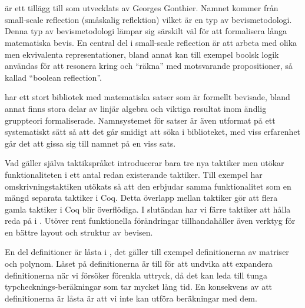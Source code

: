 \section{\ssr{}}
\label{sec:ssr}
\ssr{} är ett tillägg till \coq{} som utvecklats av Georges Gonthier. Namnet
kommer från small-scale reflection (småskalig reflektion) vilket är en typ av
bevismetodologi. Denna typ av bevismetodologi lämpar sig särskilt väl för att
formalisera långa matematiska bevis. En central del i small-scale reflection är
att arbeta med olika men ekvivalenta representationer, bland annat kan till
exempel boolsk logik användas för att resonera kring och ``räkna'' med
motsvarande propositioner, så kallad ``boolean reflection''.

\ssr{} har ett stort bibliotek med matematiska satser som är formellt bevisade,
bland annat finns stora delar av linjär algebra och viktiga resultat inom
ändlig gruppteori formaliserade. Namnsystemet för satser är även utformat på
ett systematiskt sätt så att det går smidigt att söka i biblioteket, med viss
erfarenhet går det att gissa sig till namnet på en viss sats.

Vad gäller själva taktikspråket introducerar \ssr{} bara tre nya taktiker men
utökar funktionaliteten i ett antal redan existerande taktiker. Till exempel
har omskrivningstaktiken  utökats så att den erbjudar samma
funktionalitet som en mängd separata taktiker i Coq. Detta överlapp mellan
taktiker gör att flera gamla taktiker i Coq blir överflödiga. I slutändan har
vi färre taktiker att hålla reda på i \ssr{}. Utöver rent funktionella
förändringar tillhandahåller \ssr{} även verktyg för en bättre layout och
struktur av bevisen.

En del definitioner är låsta i \ssr{}, det gäller till exempel definitionerna
av matriser och polynom. Låset på definitionerna är till för att undvika att
expandera definitionerna när vi försöker förenkla uttryck, då det kan leda till
tunga typchecknings-beräkningar som tar mycket lång tid. En konsekvens av att
definitionerna är låsta är att vi inte kan utföra beräkningar med dem.
